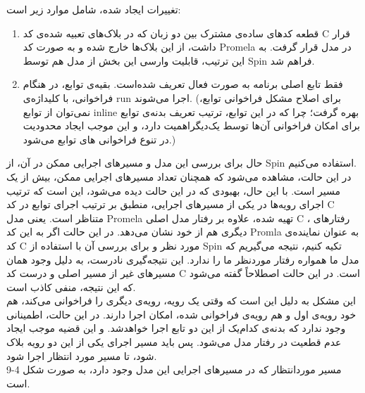 تغییرات ایجاد شده، شامل موارد زیر است:
\begin{enumerate}
	\item قطعه کدهای ساده‌ی مشترک بین دو زبان که در بلاک‌های تعبیه شده‌ی کد C     قرار داشت، از این بلاک‌ها خارج شده و به صورت کد Promela در مدل قرار گرفت. به این ترتیب، قابلیت وارسی این بخش از مدل هم توسط Spin فراهم شد.
	\item فقط تابع اصلی برنامه به صورت فعال تعریف شده‌است. بقیه‌ی توابع، در هنگام فراخوانی، با کلیداژه‌ی run اجرا می‌شوند. (برای اصلاح مشکل فراخوانی توابع، نمی‌توان از توابع inline بهره گرفت؛ چرا که در این توابع، ترتیب تعریف بدنه‌ی توابع برای امکان فراخوانی آن‌ها توسط یک‌دیگراهمیت دارد، و این موجب ایجاد محدودیت در تنوع فراخوانی های توابع می‌شود.)
\end{enumerate}

حال برای بررسی این مدل و مسیرهای اجرایی ممکن در آن، از Spin استفاده می‌کنیم.
\\
در این حالت، مشاهده می‌شود که همچنان تعداد مسیرهای اجرایی ممکن، بیش از یک مسیر است. با این حال، بهبودی که در این حالت دیده می‌شود، این است که ترتیب اجرای رویه‌ها در یکی از مسیرهای اجرایی، منطبق بر ترتیب اجرای توابع در کد C متناظر است. یعنی مدل Promela تهیه شده، علاوه بر رفتار مدل اصلی C ، رفتارهای دیگری هم از خود نشان‌ می‌دهد. در این حالت اگر به این کد  Promla به عنوان نماینده‌ی کد C مورد نظر و برای بررسی آن با استفاده از Spin تکیه کنیم، نتیجه می‌گیریم که مدل ما همواره رفتار موردنظر ما را ندارد. این نتیجه‌گیری نادرست، به دلیل وجود همان مسیرهای غیر از مسیر اصلی و درست کد C است. در این حالت اصطلاحاً گفته می‌شود که این نتیجه، منفی کاذب     است.
\\
این مشکل به دلیل این است که وقتی یک رویه، رویه‌ی دیگری را فراخوانی می‌کند، هم خود رویه‌ی اول و هم رویه‌ی فراخوانی شده، امکان اجرا دارند. در این حالت، اطمینانی وجود ندارد که بدنه‌ی کدام‌یک از این دو تابع اجرا خواهدشد. و این قضیه موجب ایجاد عدم قطعیت در رفتار مدل می‌شود. پس باید مسیر اجرای یکی از این دو رویه بلاک شود، تا مسیر مورد انتظار اجرا شود.
\\
مسیر موردانتظار که در مسیرهای اجرایی این مدل وجود دارد، به صورت شکل 4-9 است.

